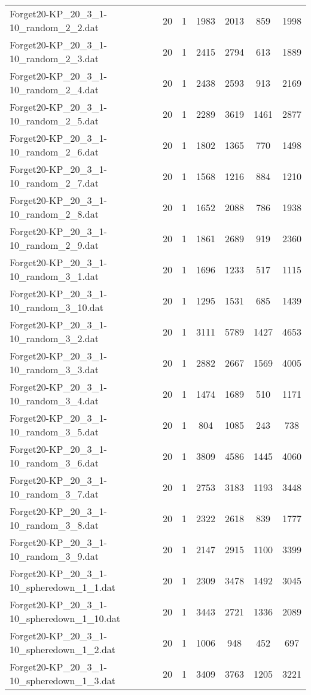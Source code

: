 \begin{table}[!ht]
\begin{tabular}{lcccccc}
Forget20-KP\_20\_3\_1-10\_random\_2\_2.dat & 20 & 1 & 1983 & 2013 & 859 & 1998 \\
Forget20-KP\_20\_3\_1-10\_random\_2\_3.dat & 20 & 1 & 2415 & 2794 & 613 & 1889 \\
Forget20-KP\_20\_3\_1-10\_random\_2\_4.dat & 20 & 1 & 2438 & 2593 & 913 & 2169 \\
Forget20-KP\_20\_3\_1-10\_random\_2\_5.dat & 20 & 1 & 2289 & 3619 & 1461 & 2877 \\
Forget20-KP\_20\_3\_1-10\_random\_2\_6.dat & 20 & 1 & 1802 & 1365 & 770 & 1498 \\
Forget20-KP\_20\_3\_1-10\_random\_2\_7.dat & 20 & 1 & 1568 & 1216 & 884 & 1210 \\
Forget20-KP\_20\_3\_1-10\_random\_2\_8.dat & 20 & 1 & 1652 & 2088 & 786 & 1938 \\
Forget20-KP\_20\_3\_1-10\_random\_2\_9.dat & 20 & 1 & 1861 & 2689 & 919 & 2360 \\
Forget20-KP\_20\_3\_1-10\_random\_3\_1.dat & 20 & 1 & 1696 & 1233 & 517 & 1115 \\
Forget20-KP\_20\_3\_1-10\_random\_3\_10.dat & 20 & 1 & 1295 & 1531 & 685 & 1439 \\
Forget20-KP\_20\_3\_1-10\_random\_3\_2.dat & 20 & 1 & 3111 & 5789 & 1427 & 4653 \\
Forget20-KP\_20\_3\_1-10\_random\_3\_3.dat & 20 & 1 & 2882 & 2667 & 1569 & 4005 \\
Forget20-KP\_20\_3\_1-10\_random\_3\_4.dat & 20 & 1 & 1474 & 1689 & 510 & 1171 \\
Forget20-KP\_20\_3\_1-10\_random\_3\_5.dat & 20 & 1 & 804 & 1085 & 243 & 738 \\
Forget20-KP\_20\_3\_1-10\_random\_3\_6.dat & 20 & 1 & 3809 & 4586 & 1445 & 4060 \\
Forget20-KP\_20\_3\_1-10\_random\_3\_7.dat & 20 & 1 & 2753 & 3183 & 1193 & 3448 \\
Forget20-KP\_20\_3\_1-10\_random\_3\_8.dat & 20 & 1 & 2322 & 2618 & 839 & 1777 \\
Forget20-KP\_20\_3\_1-10\_random\_3\_9.dat & 20 & 1 & 2147 & 2915 & 1100 & 3399 \\
Forget20-KP\_20\_3\_1-10\_spheredown\_1\_1.dat & 20 & 1 & 2309 & 3478 & 1492 & 3045 \\
Forget20-KP\_20\_3\_1-10\_spheredown\_1\_10.dat & 20 & 1 & 3443 & 2721 & 1336 & 2089 \\
Forget20-KP\_20\_3\_1-10\_spheredown\_1\_2.dat & 20 & 1 & 1006 & 948 & 452 & 697 \\
Forget20-KP\_20\_3\_1-10\_spheredown\_1\_3.dat & 20 & 1 & 3409 & 3763 & 1205 & 3221 \\

\end{tabular}
\end{table}
